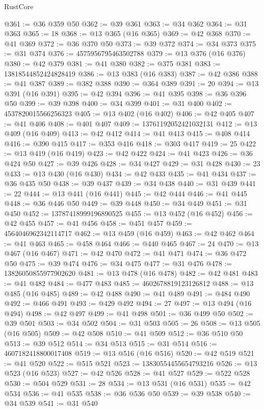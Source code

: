 \begin{lexlean}{RustCore}
\begin{coremodule}
@361 := @36 @359 @50
@362 := @39 @361
@363 := @34 @362
@364 := @31 @363
@365 := 18
@368 := @13 @365 (@16 @365)
@369 := @42 @368
@370 := @41 @369
@372 := @36 @370 @50
@373 := @39 @372
@374 := @34 @373
@375 := @31 @374
@376 := 4575956795463502788
@379 := @13 @376 (@16 @376)
@380 := @42 @379
@381 := @41 @380
@382 := @375 @381
@383 := 13818544852424828419
@386 := @13 @383 (@16 @383)
@387 := @42 @386
@388 := @41 @387
@389 := @382 @388
@390 := @364 @389
@391 := 20
@394 := @13 @391 (@16 @391)
@395 := @42 @394
@396 := @41 @395
@398 := @36 @396 @50
@399 := @39 @398
@400 := @34 @399
@401 := @31 @400
@402 := 4537820015566256323
@405 := @13 @402 (@16 @402)
@406 := @42 @405
@407 := @41 @406
@408 := @401 @407
@409 := 13761192052421032131
@412 := @13 @409 (@16 @409)
@413 := @42 @412
@414 := @41 @413
@415 := @408 @414
@416 := @390 @415
@417 := @353 @416
@418 := @303 @417
@419 := 25
@422 := @13 @419 (@16 @419)
@423 := @42 @422
@424 := @41 @423
@426 := @36 @424 @50
@427 := @39 @426
@428 := @34 @427
@429 := @31 @428
@430 := 23
@433 := @13 @430 (@16 @430)
@434 := @42 @433
@435 := @41 @434
@437 := @36 @435 @50
@438 := @39 @437
@439 := @34 @438
@440 := @31 @439
@441 := 22
@444 := @13 @441 (@16 @441)
@445 := @42 @444
@446 := @41 @445
@448 := @36 @446 @50
@449 := @39 @448
@450 := @34 @449
@451 := @31 @450
@452 := 13787418999196890525
@455 := @13 @452 (@16 @452)
@456 := @42 @455
@457 := @41 @456
@458 := @451 @457
@459 := 4564046962342114717
@462 := @13 @459 (@16 @459)
@463 := @42 @462
@464 := @41 @463
@465 := @458 @464
@466 := @440 @465
@467 := 24
@470 := @13 @467 (@16 @467)
@471 := @42 @470
@472 := @41 @471
@474 := @36 @472 @50
@475 := @39 @474
@476 := @34 @475
@477 := @31 @476
@478 := 13826050855977902620
@481 := @13 @478 (@16 @478)
@482 := @42 @481
@483 := @41 @482
@484 := @477 @483
@485 := 4602678819123126812
@488 := @13 @485 (@16 @485)
@489 := @42 @488
@490 := @41 @489
@491 := @484 @490
@492 := @466 @491
@493 := @429 @492
@494 := 27
@497 := @13 @494 (@16 @494)
@498 := @42 @497
@499 := @41 @498
@501 := @36 @499 @50
@502 := @39 @501
@503 := @34 @502
@504 := @31 @503
@505 := 26
@508 := @13 @505 (@16 @505)
@509 := @42 @508
@510 := @41 @509
@512 := @36 @510 @50
@513 := @39 @512
@514 := @34 @513
@515 := @31 @514
@516 := 4607182418800017408
@519 := @13 @516 (@16 @516)
@520 := @42 @519
@521 := @41 @520
@522 := @515 @521
@523 := 13830554455654793216
@526 := @13 @523 (@16 @523)
@527 := @42 @526
@528 := @41 @527
@529 := @522 @528
@530 := @504 @529
@531 := 28
@534 := @13 @531 (@16 @531)
@535 := @42 @534
@536 := @41 @535
@538 := @36 @536 @50
@539 := @39 @538
@540 := @34 @539
@541 := @31 @540

\end{coremodule}
\end{lexlean}
